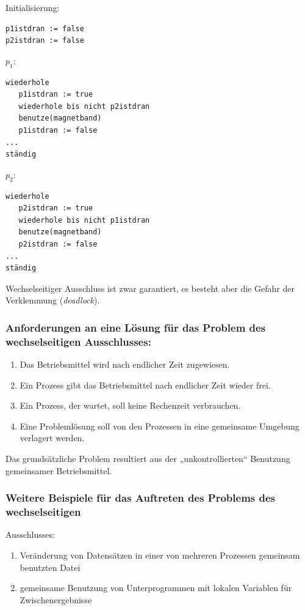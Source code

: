 \documentclass[11pt]{article}
\begin{document}
Initialisierung:

\begin{verbatim}
p1istdran := false
p2istdran := false
\end{verbatim}
\begin{nebeneinander}
\(p_1\):
\begin{verbatim}
wiederhole
   p1istdran := true
   wiederhole bis nicht p2istdran
   benutze(magnetband)
   p1istdran := false
...  
ständig
\end{verbatim}
\end{nebeneinander}
\begin{nebeneinander}
\(p_2\):
\begin{verbatim}
wiederhole
   p2istdran := true
   wiederhole bis nicht p1istdran
   benutze(magnetband)
   p2istdran := false
...
ständig
\end{verbatim}
\end{nebeneinander}
\begin{clear}
\end{clear}
Wechselseitiger Ausschluss ist zwar garantiert, es besteht aber die
Gefahr der Verklemmung (\emph{deadlock}).

\subsubsection*{Anforderungen an eine Lösung für das Problem des wechselseitigen Ausschlusses:}
\label{sec:org1c6da69}

\begin{enumerate}
\item Das Betriebsmittel wird nach endlicher Zeit zugewiesen.
\item Ein Prozess gibt das Betriebsmittel nach endlicher Zeit wieder frei.
\item Ein Prozess, der wartet, soll keine Rechenzeit verbrauchen.
\item Eine Problemlösung soll von den Prozessen in eine gemeinsame Umgebung
verlagert werden.
\end{enumerate}
Das grundsätzliche Problem resultiert aus der „unkontrollierten“
Benutzung gemeinsamer Betriebsmittel.

\subsubsection*{Weitere Beispiele für das Auftreten des Problems des wechselseitigen}
\label{sec:orga81e02f}
Ausschlusses:

\begin{enumerate}
\item Veränderung von Datensätzen in einer von mehreren Prozessen gemeinsam
benutzten Datei

\item gemeinsame Benutzung von Unterprogrammen mit lokalen Variablen für
Zwischenergebnisse
\end{enumerate}
\end{document}
